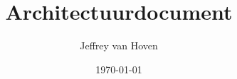\documentclass{Quintorthesis}
\begin{document}
  \begin{titlepage}
    \title{Architectuurdocument}
    \author{Jeffrey van Hoven}
    \date{\today}
    \maketitle
  \end{titlepage}

  \newpage
  \tableofcontents

  
  
  

    
  \setlength\bibsep{\baselineskip}  
\end{document}
